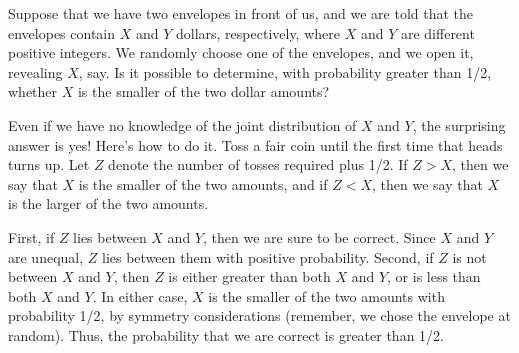 \begin{example}\label{exam 4.3.6}
Suppose that we have two envelopes in front of us, and we are told that the
envelopes contain
$X$ and $Y$ dollars, respectively, where $X$ and $Y$ are different positive integers.  We randomly
choose one of the envelopes, and we open it, revealing $X$, say.  Is it possible to determine, with
probability greater than 1/2, whether $X$ is the smaller of the two dollar amounts?
\par
Even if we have no knowledge of the joint distribution of $X$ and $Y$, the surprising answer 
is yes!  Here's how to do it.  Toss a fair coin until the first time that heads turns up.  Let $Z$
denote the number of tosses required plus 1/2.  If $Z > X$, then we say that $X$ is the smaller of the 
two amounts, and if $Z < X$, then we say that $X$ is the larger of the two amounts.  
\par
First, if $Z$ lies between $X$ and $Y$, then we are sure to be correct.  Since $X$ and $Y$ are 
unequal, $Z$ lies between them with positive probability.  Second, if $Z$ is not between $X$ and $Y$,
then $Z$ is either greater than both $X$ and $Y$, or is less than both $X$ and $Y$.  In either 
case, $X$ is the smaller of the two amounts with probability 1/2, by symmetry considerations (remember,
we chose the envelope at random).  Thus, the probability that we are correct is greater than 1/2.
\end{example}

